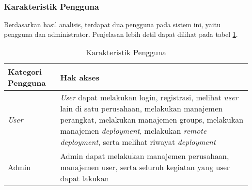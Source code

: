 \subsubsection{Karakteristik Pengguna}
Berdasarkan hasil analisis, terdapat dua pengguna pada sistem ini, yaitu pengguna dan administrator. Penjelasan lebih detil dapat dilihat pada tabel \ref{tab:karakteristik-pengguna}.

\bgroup
\begin{table}[ht]
  \def\arraystretch{1.7}
  \caption{Karakteristik Pengguna}
  \label{tab:karakteristik-pengguna}
  \centering
  \begin{tabular}{|p{2cm}|p{8cm}|}
    \hline
    Kategori Pengguna & Hak akses                                                                                                                                                                                                                                                                           \\
    \hline
    \textit{User}     & \textit{User} dapat melakukan login, registrasi, melihat \textit{user} lain di satu perusahaan, melakukan manajemen perangkat, melakukan manajemen groups, melakukan manajemen \textit{deployment}, melakukan \textit{remote deployment}, serta melihat riwayat \textit{deployment} \\
    \hline
    Admin             & Admin dapat melakukan manajemen perusahaan, manajemen user, serta seluruh kegiatan yang user dapat lakukan                                                                                                                                                                          \\
    \hline
  \end{tabular}
\end{table}
\egroup
